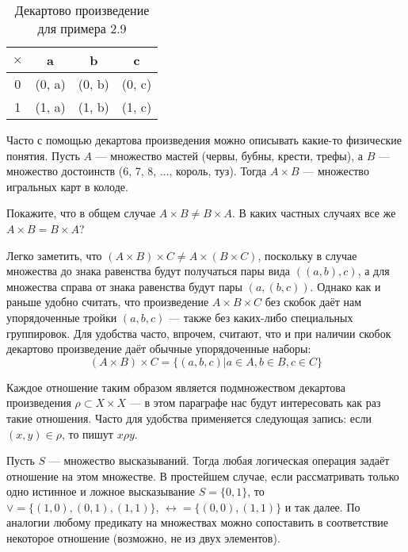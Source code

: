\begin{table}[h]
\centering
\begin{tabular}{c|ccc}
$\times$ & a&b&c\\
\hline
0 & (0, a) & (0, b) & (0, c) \\
1 & (1, a) & (1, b) & (1, c)
\end{tabular}
\caption{Декартово произведение для примера 2.9}
\end{table}

\begin{example}
Часто с помощью декартова произведения можно описывать какие-то физические понятия. Пусть $A$ — множество мастей (червы, бубны, крести, трефы), а $B$ — множество достоинств (6, 7, 8, ..., король, туз). Тогда $A \times B$ — множество игральных карт в колоде.
\end{example}

\begin{exercise}
Покажите, что в общем случае $A\times B \not = B \times A$. В каких частных случаях все же $A\times B = B \times A$?
\end{exercise}

Легко заметить, что $(A\times B)\times C \not= A\times (B \times C)$, поскольку в случае множества до знака равенства будут получаться пары вида $((a, b), c)$, а для множества справа от знака равенства будут пары $(a, (b, c))$. Однако как и раньше удобно считать, что произведение $A\times B\times C$ без скобок даёт нам упорядоченные тройки $(a, b, c)$ — также без каких-либо специальных группировок. Для удобства часто, впрочем, считают, что и при наличии скобок декартово произведение даёт обычные упорядоченные наборы: 
$$(A\times B)\times C = \{(a, b, c)|a\in A, b\in B, c\in C\}$$

Каждое отношение таким образом является подмножеством декартова произведения $\rho \subset X\times X$ — в этом параграфе нас будут интересовать как раз такие отношения. Часто для удобства применяется следующая запись: если $(x, y) \in \rho$, то пишут $x\rho y$.

\begin{example}
Пусть $S$ — множество высказываний. Тогда любая логическая операция задаёт отношение на этом множестве. В простейшем случае, если рассматривать только одно истинное и ложное высказывание $S = \{0, 1\}$, то $\vee = \{(1, 0), (0, 1), (1, 1)\}$, $\leftrightarrow = \{(0, 0), (1, 1)\}$ и так далее. По аналогии любому предикату на множествах можно сопоставить в соответствие некоторое отношение (возможно, не из двух элементов).
\end{example}


